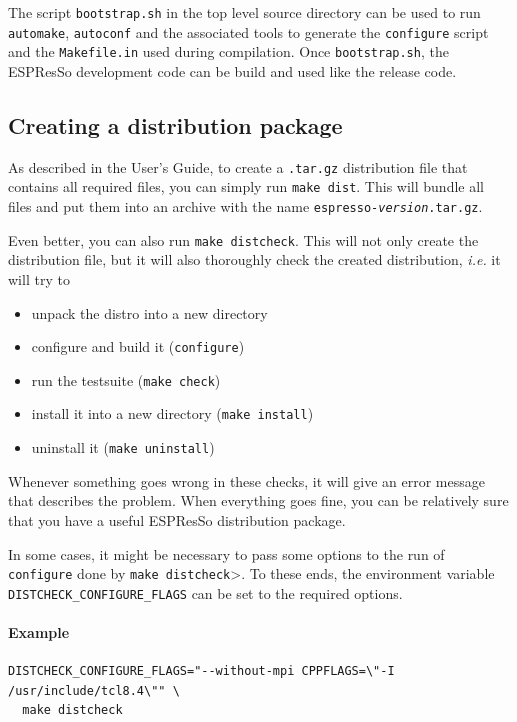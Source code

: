 \documentclass[
a4paper,                        %
11pt,                           %
twoside,                        %
footsepline,                    %
headsepline,                    %
headexclude,                    %
footexclude,                    %
pagesize,                       %
bibtotocnumbered,               %
idxtotoc                        %
]{scrartcl}
\newcommand{\es}{\mbox{\textsf{ESPResSo}}\xspace}
\newcommand{\ie}{\textit{i.e.}\xspace}
\begin{document}
The script \texttt{bootstrap.sh} in the top level source directory can
be used to run \texttt{automake}, \texttt{autoconf} and the associated
tools to generate the \texttt{configure} script and the
\texttt{Makefile.in} used during compilation.  Once
\texttt{bootstrap.sh}, the \es development code can be build and used
like the release code.

\subsection{Creating a distribution package}

As described in the User's Guide, to create a \texttt{.tar.gz}
distribution file that contains all required files, you can simply run
\texttt{make dist}. This will bundle all files and put them into an
archive with the name
\texttt{espresso-\textit{version}\texttt{.tar.gz}}.

Even better, you can also run \texttt{make distcheck}. This will not
only create the distribution file, but it will also thoroughly check
the created distribution, \ie it will try to 
\begin{itemize}
\item unpack the distro into a new directory
\item configure and build it (\texttt{configure})
\item run the testsuite (\texttt{make check})
\item install it into a new directory (\texttt{make install})
\item uninstall it (\texttt{make uninstall})
\end{itemize}
Whenever something goes wrong in these checks, it will give an error
message that describes the problem. When everything goes fine, you can
be relatively sure that you have a useful \es distribution
package.

In some cases, it might be necessary to pass some options to the run
of \texttt{configure} done by \texttt{make distcheck}>. To these ends,
the environment variable \texttt{DISTCHECK\_CONFIGURE\_FLAGS} can be
set to the required options.

\paragraph{Example}
\begin{verbatim}
DISTCHECK_CONFIGURE_FLAGS="--without-mpi CPPFLAGS=\"-I /usr/include/tcl8.4\"" \
  make distcheck
\end{verbatim}
\end{document}
